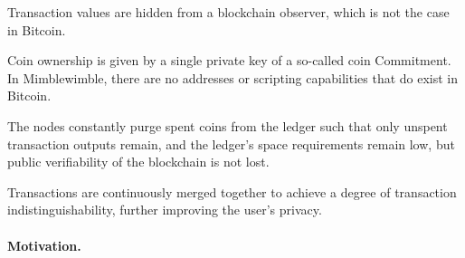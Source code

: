 \begin{asparaitem}
    \item Transaction values are hidden from a blockchain observer, which is not the case in Bitcoin.
    \item Coin ownership is given by a single private key of a so-called coin Commitment.
    In Mimblewimble, there are no addresses or scripting capabilities that do exist in Bitcoin.
    \item The nodes constantly purge spent coins from the ledger such that only unspent transaction outputs remain, and the ledger's space requirements remain low, but public verifiability of the blockchain is not lost.
    \item Transactions are continuously merged together to achieve a degree of transaction indistinguishability, further improving the user's privacy.
\end{asparaitem}

\paragraph{Motivation.}


